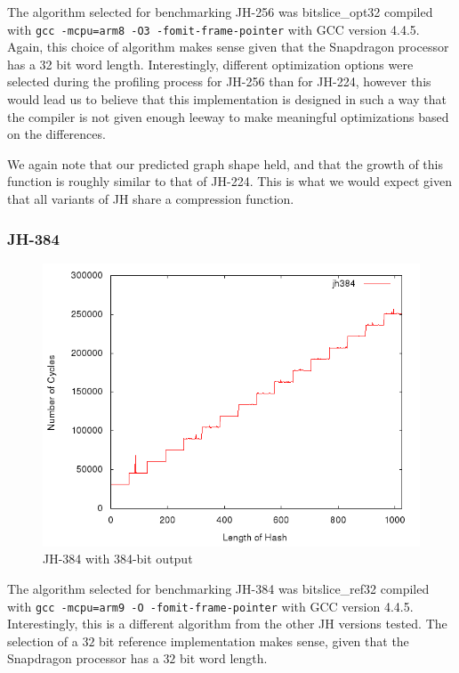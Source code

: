 The algorithm selected for benchmarking JH-256 was bitslice\_opt32 compiled with
\texttt{gcc -mcpu=arm8 -O3 -fomit-frame-pointer} with GCC version 4.4.5. Again,
this choice of algorithm makes sense given that the Snapdragon processor has a
32 bit word length. Interestingly, different optimization options were selected
during the profiling process for JH-256 than for JH-224, however this would lead
us to believe that this implementation is designed in such a way that the
compiler is not given enough leeway to make meaningful optimizations based on
the differences.

We again note that our predicted graph shape held, and that the growth of this
function is roughly similar to that of JH-224. This is what we would expect
given that all variants of JH share a compression function.


\subsubsection{JH-384}
\begin{figure}[H]
    \begin{center}
        \includegraphics[scale=0.5]{images/jh384.png} 
        \caption{JH-384 with 384-bit output}
    \end{center}
\end{figure}

The algorithm selected for benchmarking JH-384 was bitslice\_ref32 compiled with
\texttt{gcc -mcpu=arm9 -O -fomit-frame-pointer} with GCC version 4.4.5.
Interestingly, this is a different algorithm from the other JH versions tested.
The selection of a $32$ bit reference implementation makes sense, given that the
Snapdragon processor has a $32$ bit word length. 

